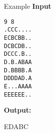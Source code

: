 Example
\textbf{Input}
\begin{verbatim}
9 8
.CCC....
ECBCBB..
DCBCDB..
DCCC.B..
D.B.ABAA
D.BBBB.A
DDDDAD.A
E...AAAA
EEEEEE..
\end{verbatim}




\textbf{Output:}





EDABC